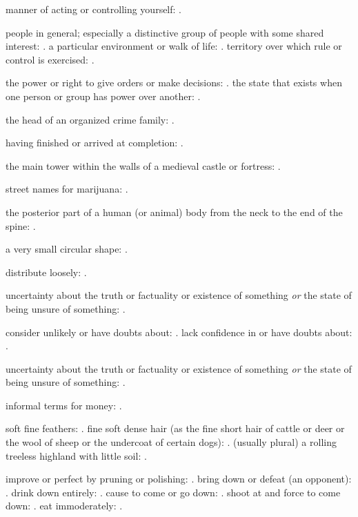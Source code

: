   manner of acting or controlling yourself: .

  people in general; especially a distinctive group of people with some shared interest: . a particular environment or walk of life: . territory over which rule or control is exercised: .

  the power or right to give orders or make decisions: . the state that exists when one person or group has power over another: .

  the head of an organized crime family: .

  having finished or arrived at completion: .

  the main tower within the walls of a medieval castle or fortress: .

  street names for marijuana: .

  the posterior part of a human (or animal) body from the neck to the end of the spine: .

  a very small circular shape: .

  distribute loosely: .

  uncertainty about the truth or factuality or existence of something \textit{or} the state of being unsure of something: .

  consider unlikely or have doubts about: . lack confidence in or have doubts about: .

  uncertainty about the truth or factuality or existence of something \textit{or} the state of being unsure of something: .

  informal terms for money: .

  soft fine feathers: . fine soft dense hair (as the fine short hair of cattle or deer or the wool of sheep or the undercoat of certain dogs): . (usually plural) a rolling treeless highland with little soil: .

  improve or perfect by pruning or polishing: . bring down or defeat (an opponent): . drink down entirely: . cause to come or go down: . shoot at and force to come down: . eat immoderately: .

